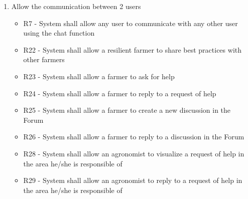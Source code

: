 \begin{enumerate}[label=\textbf{G.\arabic*}]
\begin{itemize} [label =]
        \item R16 - System shall store all crops that can be planted in Telangana
        \item R19 - System shall store all data of production of farmers
        \item DA1 - All Telangana’s people, who interact with system, have an internet connection
        \item DA2 - All Telangana’s people, who interact with system, have access to a browser
        \item DA3 - Every time a farmer incurs into a problem, he/she inserts the details in the system
        \item DA4 - At the end of each month, farmers insert into the system the result of their production
        \item DA13 - Farmers are ranked based on their productivity per acre
        \item DA14 - All lands in Telangana have a sensor of humidity of the soil
        \item DA15 - Water distribution system has sensor to measure the amount of water given to each land
        \item DA16 - Water distribution sensors never stop to work
        \item DA17 - Humidity sensors in a land never stop to work
    \end{itemize}
    \item Allow the communication between 2 users
    \begin{itemize}[label =]
        \item R7 - System shall allow any user to communicate with any other user using the chat function
        \item R22 - System shall allow a resilient farmer to share best practices with other farmers
        \item R23 - System shall allow a farmer to ask for help
        \item R24 - System shall allow a farmer to reply to a request of help
        \item R25 - System shall allow a farmer to create a new discussion in the Forum
        \item R26 - System shall allow a farmer to reply to a discussion in the Forum
        \item R28 - System shall allow an agronomist to visualize a request of help in the area he/she is responsible of
        \item R29 - System shall allow an agronomist to reply to a request of help in the area he/she is responsible of

\end{itemize}
\end{enumerate}
